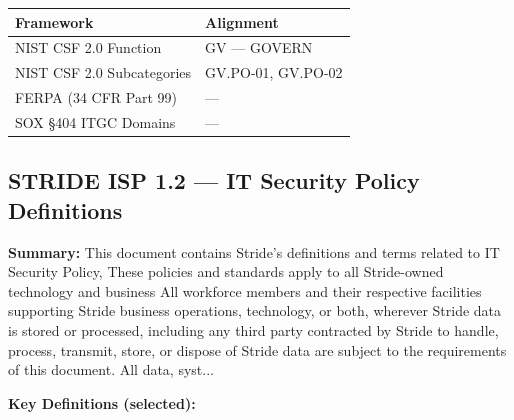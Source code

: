 \documentclass[11pt,landscape]{article}
\begin{document}
\begin{tabularx}{\textwidth}{|p{4cm}|X|}
\hline
\rowcolor{headgray} \textbf{Framework} & \textbf{Alignment} \\
\hline
NIST CSF 2.0 Function & GV --- GOVERN \\
\hline
NIST CSF 2.0 Subcategories & GV.PO-01, GV.PO-02 \\
\hline
FERPA (34 CFR Part 99) & --- \\
\hline
SOX §404 ITGC Domains & --- \\
\hline
\end{tabularx}


\subsection{\textcolor{strideblue}{STRIDE ISP 1.2} --- IT Security Policy Definitions}
\label{pol:ISP12}

\textbf{Summary:} This document contains Stride’s definitions and terms related to IT Security Policy, These policies and standards apply to all Stride-owned technology and business All workforce members and their respective facilities supporting Stride business operations, technology, or both, wherever Stride data is stored or processed, including any third party contracted by Stride to handle, process, transmit, store, or dispose of Stride data are subject to the requirements of this document. All data, syst...

\textbf{Key Definitions (selected):}
\end{document}
